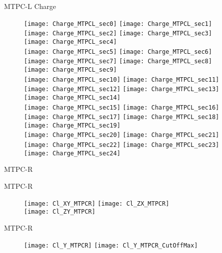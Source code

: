 \documentclass[11pt]{beamer}
\begin{document}
\begin{frame}{MTPC-L Charge}
\begin{figure}
\texttt{[image: Charge\_MTPCL\_sec0]}
\texttt{[image: Charge\_MTPCL\_sec1]}
\texttt{[image: Charge\_MTPCL\_sec2]}
\texttt{[image: Charge\_MTPCL\_sec3]}
\texttt{[image: Charge\_MTPCL\_sec4]}\\
\texttt{[image: Charge\_MTPCL\_sec5]}
\texttt{[image: Charge\_MTPCL\_sec6]}
\texttt{[image: Charge\_MTPCL\_sec7]}
\texttt{[image: Charge\_MTPCL\_sec8]}
\texttt{[image: Charge\_MTPCL\_sec9]}\\
\texttt{[image: Charge\_MTPCL\_sec10]}
\texttt{[image: Charge\_MTPCL\_sec11]}
\texttt{[image: Charge\_MTPCL\_sec12]}
\texttt{[image: Charge\_MTPCL\_sec13]}
\texttt{[image: Charge\_MTPCL\_sec14]}\\
\texttt{[image: Charge\_MTPCL\_sec15]}
\texttt{[image: Charge\_MTPCL\_sec16]}
\texttt{[image: Charge\_MTPCL\_sec17]}
\texttt{[image: Charge\_MTPCL\_sec18]}
\texttt{[image: Charge\_MTPCL\_sec19]}\\
\texttt{[image: Charge\_MTPCL\_sec20]}
\texttt{[image: Charge\_MTPCL\_sec21]}
\texttt{[image: Charge\_MTPCL\_sec22]}
\texttt{[image: Charge\_MTPCL\_sec23]}
\texttt{[image: Charge\_MTPCL\_sec24]}
\end{figure}
\end{frame}

\begin{frame}
\centering
\Huge
MTPC-R
\end{frame}

\begin{frame}{MTPC-R}
\begin{figure}
\texttt{[image: Cl\_XY\_MTPCR]}
\texttt{[image: Cl\_ZX\_MTPCR]}\\
\texttt{[image: Cl\_ZY\_MTPCR]}
\end{figure}
\end{frame}

\begin{frame}{MTPC-R}
\begin{figure}
\texttt{[image: Cl\_Y\_MTPCR]}
\texttt{[image: Cl\_Y\_MTPCR\_CutOffMax]}
\end{figure}
\end{frame}
\end{document}
